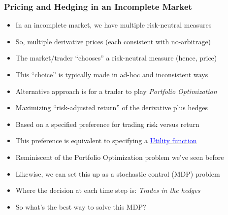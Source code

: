 \documentclass[handout]{beamer}
\begin{document}
\begin{frame}
\frametitle{Pricing and Hedging in an Incomplete Market}
\pause
\begin{itemize}[<+->]
\item In an incomplete market, we have multiple risk-neutral measures
\item So, multiple derivative prices (each consistent with no-arbitrage)
\item The market/trader ``chooses'' a risk-neutral measure (hence, price)
\item This ``choice'' is typically made in ad-hoc and inconsistent ways
\item Alternative approach is for a trader to play {\em Portfolio Optimization}
\item Maximizing ``risk-adjusted return'' of the derivative plus hedges
\item Based on a specified preference for trading risk versus return
\item This preference is equivalent to specifying a \href{https://github.com/coverdrive/technical-documents/blob/master/finance/cme241/UtilityTheoryForRisk.pdf}{\underline{\textcolor{blue}{Utility function}}}
\item Reminiscent of the Portfolio Optimization problem we've seen before
\item Likewise, we can set this up as a stochastic control (MDP) problem
\item Where the decision at each time step is: {\em Trades in the hedges}
\item So what's the best way to solve this MDP?
\end{itemize}
\end{frame}
\end{document}
